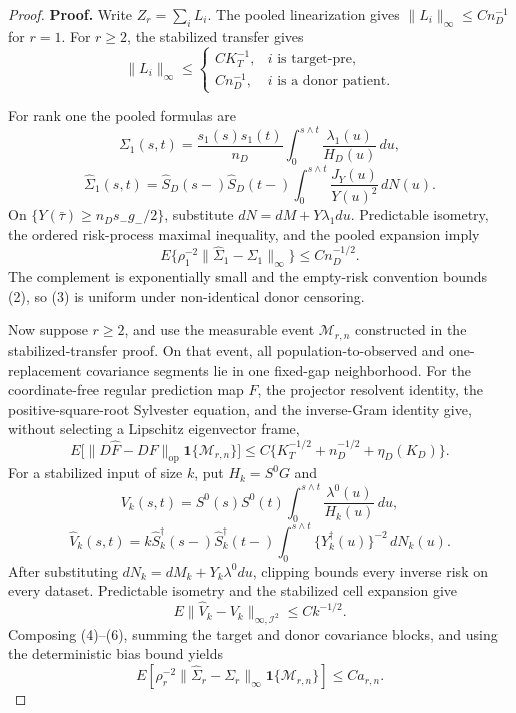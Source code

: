 \documentclass{article}
\begin{document}
\begin{proof}
\textbf{Proof.}
Write \(Z_r=\sum_iL_i\).  The pooled linearization gives \(\|L_i\|_\infty\le Cn_D^{-1}\) for \(r=1\).  For \(r\ge2\), the stabilized transfer gives
\[
 \|L_i\|_\infty\le
 \begin{cases}
 CK_T^{-1},&i\text{ is target-pre},\\
 Cn_D^{-1},&i\text{ is a donor patient}.
 \end{cases}                                             \tag{1}
\]

For rank one the pooled formulas are
\[
 \Sigma_1(s,t)=\frac{s_1(s)s_1(t)}{n_D}
 \int_0^{s\wedge t}\frac{\lambda_1(u)}{H_D(u)}\,du,
\]
\[
 \widehat\Sigma_1(s,t)=\widehat S_D(s-)\widehat S_D(t-)
 \int_0^{s\wedge t}\frac{J_Y(u)}{Y(u)^2}\,dN(u).       \tag{2}
\]
On \(\{Y(\bar\tau)\ge n_Ds_-g_-/2\}\), substitute \(dN=dM+Y\lambda_1du\).  Predictable isometry, the ordered risk-process maximal inequality, and the pooled expansion imply
\[
 E\{\rho_1^{-2}\|\widehat\Sigma_1-\Sigma_1\|_\infty\}
 \le Cn_D^{-1/2}.                                       \tag{3}
\]
The complement is exponentially small and the empty-risk convention bounds (2), so (3) is uniform under non-identical donor censoring.

Now suppose \(r\ge2\), and use the measurable event \(\mathcal M_{r,n}\) constructed in the stabilized-transfer proof.  On that event, all population-to-observed and one-replacement covariance segments lie in one fixed-gap neighborhood.  For the coordinate-free regular prediction map \(F\), the projector resolvent identity, the positive-square-root Sylvester equation, and the inverse-Gram identity give, without selecting a Lipschitz eigenvector frame,
\[
 E\bigl[\|D\widehat F-DF\|_{\mathrm{op}}
 \mathbf1\{\mathcal M_{r,n}\}\bigr]
 \le C\{K_T^{-1/2}+n_D^{-1/2}+\eta_D(K_D)\}.           \tag{4}
\]
For a stabilized input of size \(k\), put \(H_k=S^0G\) and
\[
 V_k(s,t)=S^0(s)S^0(t)\int_0^{s\wedge t}
 \frac{\lambda^0(u)}{H_k(u)}\,du,
\]
\[
 \widehat V_k(s,t)=k\widehat S_k^\dagger(s-)
 \widehat S_k^\dagger(t-)
 \int_0^{s\wedge t}\{Y_k^\dagger(u)\}^{-2}\,dN_k(u). \tag{5}
\]
After substituting \(dN_k=dM_k+Y_k\lambda^0du\), clipping bounds every inverse risk on every dataset.  Predictable isometry and the stabilized cell expansion give
\[
 E\|\widehat V_k-V_k\|_{\infty,\mathcal I^2}\le Ck^{-1/2}. \tag{6}
\]
Composing (4)--(6), summing the target and donor covariance blocks, and using the deterministic bias bound yields
\[
 E\left[\rho_r^{-2}
 \|\widehat\Sigma_r-\Sigma_r\|_\infty
 \mathbf1\{\mathcal M_{r,n}\}\right]
 \le Ca_{r,n}.                                          \tag{7}
\]


\end{proof}
\end{document}

